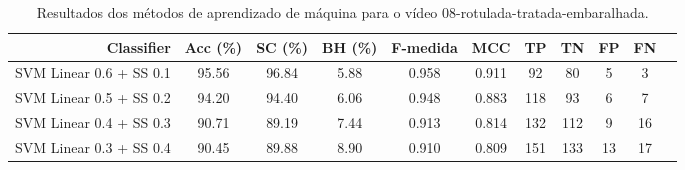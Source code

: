 \begin{table}[!htb]
\centering
\caption{Resultados dos métodos de aprendizado de máquina para o vídeo 08-rotulada-tratada-embaralhada.}
\label{tab:08-rotulada-tratada-embaralhada}
\begin{tabular}{r|c|c|c|c|c|c|c|c|c|c}
\hline\hline
Classifier & Acc (\%) & SC (\%) & BH (\%) & F-medida & MCC & TP & TN & FP & FN \\ \hline
SVM Linear 0.6 + SS 0.1 & 95.56 & 96.84 & 5.88 & 0.958 & 0.911 & 92 & 80 & 5 & 3 \\ 
SVM Linear 0.5 + SS 0.2 & 94.20 & 94.40 & 6.06 & 0.948 & 0.883 & 118 & 93 & 6 & 7 \\ 
SVM Linear 0.4 + SS 0.3 & 90.71 & 89.19 & 7.44 & 0.913 & 0.814 & 132 & 112 & 9 & 16 \\ 
SVM Linear 0.3 + SS 0.4 & 90.45 & 89.88 & 8.90 & 0.910 & 0.809 & 151 & 133 & 13 & 17 \\ 
\hline\hline
\end{tabular}
\end{table}
